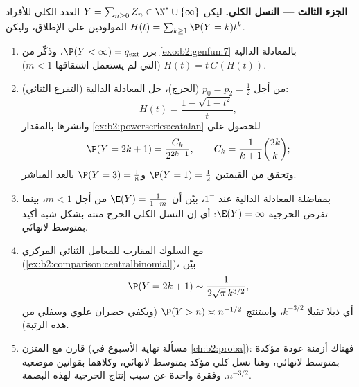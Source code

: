 \begin{problem}
\medskip
\noindent\textbf{الجزء الثالث --- النسل الكلي.} ليكن $Y =
\sum_{n\geq0}Z_n \in \N^* \cup \{\infty\}$ العدد
الكلي للأفراد المولودين على الإطلاق، وليكن $H(t) =
\sum_{k\geq1}\P(Y = k)t^k$.
\begin{enumerate}[resume]
  \item برر $\P(Y < \infty) = q_{\mathrm{ext}}$، وذكّر من \cref{exo:b2:genfun:7} بالمعادلة الدالية $H(t) = t\,G(H(t))$ (التي
        لم يستعمل اشتقاقها $m < 1$).
  \item (التفرع الثنائي) من أجل $p_0 = p_2 = \frac12$ (الحرج)، حل المعادلة الدالية:
        \[
        H(t) = \frac{1 - \sqrt{1 - t^2}}{t},
        \]
        وانشرها بالمقدار \cref{ex:b2:powerseries:catalan} للحصول على
        \[
        \P(Y = 2k + 1) = \frac{C_k}{2^{2k+1}},
        \qquad C_k = \frac1{k+1}\binom{2k}k ;
        \]
        وتحقق من القيمتين $\P(Y = 1) = \frac12$ و$\P(Y = 3)
        = \frac18$ بالعد المباشر.
  \item بمفاضلة المعادلة الدالية عند $1^-$، بيّن أن $\E(Y) = \frac{1}{1-m}$ من أجل
        $m < 1$، بينما تفرض الحرجية $\E(Y) = \infty$: أي إن النسل الكلي الحرج
        منته بشكل شبه أكيد بمتوسط لانهائي.
  \item مع السلوك المقارب للمعامل الثنائي المركزي (\cref{ex:b2:comparison:centralbinomial})، بيّن
        \[
        \P(Y = 2k+1) \sim \frac{1}{2\sqrt\pi\,k^{3/2}},
        \]
        أي ذيلا ثقيلا $k^{-3/2}$، واستنتج $\P(Y > n)
        \asymp n^{-1/2}$ (ويكفي حصران علوي
        وسفلي من هذه الرتبة).
  \item قارن مع  المتزن (مسألة نهاية الأسبوع في
        \cref{ch:b2:proba}): فهناك أزمنة عودة مؤكدة بمتوسط لانهائي، وهنا نسل
        كلي مؤكد بمتوسط لانهائي، وكلاهما بقوانين موضعية $n^{-3/2}$.
        وفقرة واحدة عن سبب إنتاج الحرجية لهذه البصمة.
\end{enumerate}


\end{problem}
